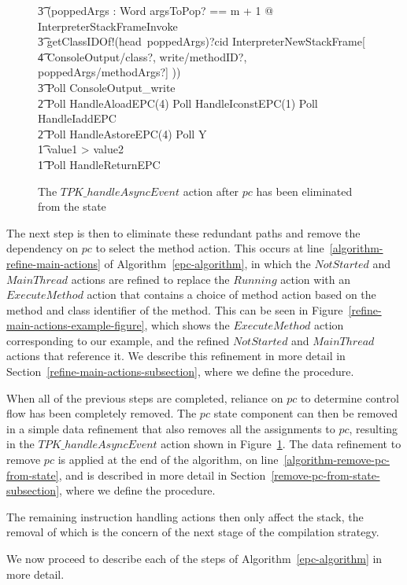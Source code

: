 \begin{figure}
\begin{circus}
    \t3 (\circvar poppedArgs : \seq Word \circspot \lschexpract \exists argsToPop? == m + 1 @ InterpreterStackFrameInvoke \rschexpract \circseq \\
    \t3 getClassIDOf!(head~poppedArgs)?cid \then \lschexpract InterpreterNewStackFrame[ \\
    \t4 ConsoleOutput/class?, write/methodID?, poppedArgs/methodArgs?] \rschexpract)) \circseq \\
    \t3 Poll \circseq ConsoleOutput\_write \\
    \t2 \circfi \circseq Poll \circseq HandleAloadEPC(4) \circseq Poll \circseq HandleIconstEPC(1) \circseq Poll \circseq HandleIaddEPC \circseq \\
    \t2 Poll \circseq HandleAstoreEPC(4) \circseq Poll \circseq Y \\
    \t1 {} \circelse value1 > value2 \circthen \Skip \\
    \t1 \circfi \circseq Poll \circseq HandleReturnEPC
  \end{circus}
  \caption{The $TPK\_handleAsyncEvent$ action after $pc$ has been eliminated from the state}
  \label{pc-elimination-HandleAsyncEvent-example-figure}
\end{figure}

The next step is then to eliminate these redundant paths and remove
the dependency on $pc$ to select the method action.
This occurs at line~\ref{algorithm-refine-main-actions} of
Algorithm~\ref{epc-algorithm}, in which the $NotStarted$ and
$MainThread$ actions are refined to replace the $Running$ action with
an $ExecuteMethod$ action that contains a choice of method action
based on the method and class identifier of the method.
This can be seen in Figure~\ref{refine-main-actions-example-figure},
which shows the $ExecuteMethod$ action corresponding to our example,
and the refined $NotStarted$ and $MainThread$ actions that reference
it.
We describe this refinement in more detail in
Section~\ref{refine-main-actions-subsection}, where we define the
 procedure.

When all of the previous steps are completed, reliance on $pc$ to
determine control flow has been completely removed.
The $pc$ state component can then be removed in a simple data
refinement that also removes all the assignments to $pc$, resulting in
the $TPK\_handleAsyncEvent$ action shown in
Figure~\ref{pc-elimination-HandleAsyncEvent-example-figure}.
The data refinement to remove $pc$ is applied at the end of the
algorithm, on line~\ref{algorithm-remove-pc-from-state}, and is
described in more detail in
Section~\ref{remove-pc-from-state-subsection}, where we define the
 procedure.

The remaining instruction handling actions then only affect the stack,
the removal of which is the concern of the next stage of the
compilation strategy.

We now proceed to describe each of the steps of
Algorithm~\ref{epc-algorithm} in more detail.